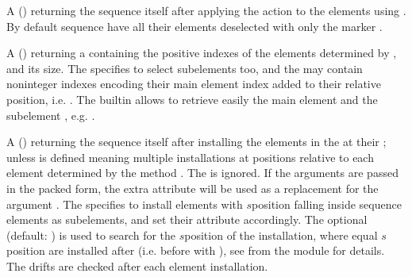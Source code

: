 \documentclass[letterpaper,10pt,english]{sphinxmanual}
\begin{document}
\begin{description}
\sphinxAtStartPar
A  (\sphinxcode{\sphinxupquote{{[}flg{]}, {[}rng{]}, {[}sel{]}, {[}not{]}}}) returning the sequence itself after applying the action  to the elements
using . By default sequence have all their elements deselected with only the  marker .

\sphinxAtStartPar
A  (\sphinxcode{\sphinxupquote{{[}rng{]}, {[}sel{]}, {[}not{]}}}) returning a  containing the positive indexes of the elements determined by ,
and its size. The   specifies to select sub\sphinxhyphen{}elements too, and the  may contain non\sphinxhyphen{}integer indexes encoding their main element
index added to their relative position, i.e. . The builtin   allows to retrieve easily the main element  and
the sub\sphinxhyphen{}element , e.g. .

\sphinxAtStartPar
A  () returning the sequence itself after installing the elements in the   at their
{\hyperref[\detokenize{sequences:element-positions}]{}}; unless  is defined meaning multiple installations at positions relative to each element determined by the method
. The   is ignored. If the arguments are passed in the packed form, the extra attribute 
will be used as a replacement for the argument . The   specifies to install elements with \(s\)\sphinxhyphen{}position falling inside
sequence elements as sub\sphinxhyphen{}elements, and set their  attribute accordingly. The optional   (default: ) is used
to search for the \(s\)\sphinxhyphen{}position of the installation, where equal \(s\)\sphinxhyphen{}position are installed after (i.e. before with ), see  from
the {\hyperref[\detokenize{utility::doc}]{}} module for details. The  drifts are checked after each element installation.


\end{description}
\end{document}
